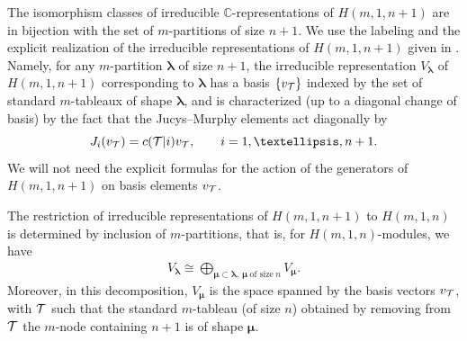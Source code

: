 \documentclass[11pt]{article}
\newcommand{\lam}{\boldsymbol{\lambda}}
\newcommand{\mum}{\boldsymbol{\mu}}
\begin{document}
The isomorphism classes of irreducible $\mathbb{C}$-representations of $H(m,1,n+1)$ are in bijection with the set of $m$-partitions of size $n+1$.
We use the labeling and the explicit realization of the irreducible representations of $H(m,1,n+1)$ given in \cite{AK}. Namely, for any $m$-partition $\lam$ of size $n+1$, the irreducible representation $V_{\lam}$ of $H(m,1,n+1)$ corresponding to $\lam$ has a basis $\{v_{{\cal{T}}}\}$ indexed by the set of standard $m$-tableaux of shape $\lam$, and is characterized (up to a diagonal change of basis) by the fact that the Jucys--Murphy elements act diagonally by
\[
J_i(v_{{\cal{T}}})=c({\cal{T}}|i) v_{{\cal{T}}}  ,\qquad  i=1,\dots,n+1.
\]
We will not need the explicit formulas for the action of the generators of $H(m,1,n+1)$ on basis elements $v_{{\cal{T}}}$.

The restriction of irreducible  representations of $H(m,1,n+1)$ to $H(m,1,n)$ is determined
by inclusion of $m$-partitions, that is, for $H(m,1,n)$-modules, we have
\begin{gather}\label{Res}
V_{\lam}\cong\bigoplus_{\mum\subset\lam ,\ \mum\ \text{of size}\ n} V_{\mum}  .
\end{gather}
Moreover, in this decomposition, $V_{\mum}$ is the space spanned by the basis vectors $v_{{\cal{T}}}$, with ${\cal{T}}$ such that the standard $m$-tableau (of size $n$) obtained by removing from ${\cal{T}}$ the $m$-node containing $n+1$  is of shape $\mum$.
\end{document}
